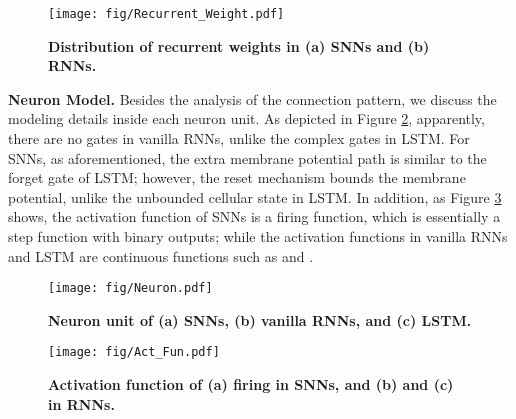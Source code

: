 \documentclass[journal,10pt,twocolumn]{IEEETran}
\begin{document}
\begin{figure}[!htbp]
\centering     
\texttt{[image: fig/Recurrent\_Weight.pdf]}
\flushleft
\caption{\textbf{Distribution of recurrent weights in (a) SNNs and (b) RNNs.}} \label{fig:recurrent_weight}
\end{figure}

\textbf{Neuron Model.} Besides the analysis of the connection pattern, we discuss the modeling details inside each neuron unit. As depicted in Figure \ref{fig:neuron}, apparently, there are no gates in vanilla RNNs, unlike the complex gates in LSTM. For SNNs, as aforementioned, the extra membrane potential path is similar to the forget gate of LSTM; however, the reset mechanism bounds the membrane potential, unlike the unbounded cellular state in LSTM. In addition, as Figure \ref{fig:act_fun} shows, the activation function of SNNs is a firing function, which is essentially a step function with binary outputs; while the activation functions in vanilla RNNs and LSTM are continuous functions such as  and .  

\begin{figure}[!htbp]
\centering     
\texttt{[image: fig/Neuron.pdf]}
\flushleft
\caption{\textbf{Neuron unit of (a) SNNs, (b) vanilla RNNs, and (c) LSTM.}} \label{fig:neuron} 
\end{figure}



\begin{figure}[!htbp]
\centering     
\texttt{[image: fig/Act\_Fun.pdf]}
\flushleft
\caption{\textbf{Activation function of (a) firing in SNNs, and (b)  and (c)  in RNNs.}} \label{fig:act_fun} 
\end{figure}

\begin{table*}[!htbp]
\caption{Summary of similarities and differences among SNNs, vanilla RNNs, and LSTM.}
\label{tab:simlarties_differences}
\vspace{2pt}
\centering
\renewcommand\arraystretch{1.5}
\end{table*}
\end{document}
